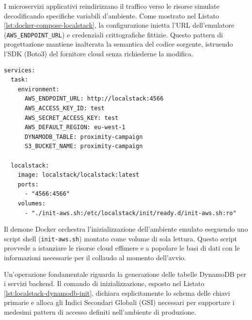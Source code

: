 I microservizi applicativi reindirizzano il traffico verso le risorse simulate decodificando specifiche variabili d'ambiente. Come mostrato nel Listato \ref{lst:docker-compose-localstack}, la configurazione inietta l'URL dell'emulatore (\texttt{AWS\_ENDPOINT\_URL}) e credenziali crittografiche fittizie. Questo pattern di progettazione mantiene inalterata la semantica del codice sorgente, istruendo l'SDK (Boto3) del fornitore cloud senza richiederne la modifica.

\begin{lstlisting}[caption={Configurazione Docker Compose per l'iniezione delle variabili d'ambiente e l'avvio di LocalStack}, label={lst:docker-compose-localstack}]
services:
  task:
    environment:
      AWS_ENDPOINT_URL: http://localstack:4566
      AWS_ACCESS_KEY_ID: test
      AWS_SECRET_ACCESS_KEY: test
      AWS_DEFAULT_REGION: eu-west-1
      DYNAMODB_TABLE: proximity-campaign
      S3_BUCKET_NAME: proximity-campaign

  localstack:
    image: localstack/localstack:latest
    ports:
      - "4566:4566"
    volumes:
      - "./init-aws.sh:/etc/localstack/init/ready.d/init-aws.sh:ro"
\end{lstlisting}

Il demone Docker orchestra l'inizializzazione dell'ambiente emulato eseguendo uno script shell (\texttt{init-aws.sh}) montato come volume di sola lettura. Questo script provvede a istanziare le risorse cloud effimere e a popolare le basi di dati con le informazioni necessarie per il collaudo al momento dell'avvio. 

Un'operazione fondamentale riguarda la generazione delle tabelle DynamoDB per i servizi backend. Il comando di inizializzazione, esposto nel Listato \ref{lst:localstack-dynamodb-init}, dichiara esplicitamente lo schema delle chiavi primarie e alloca gli Indici Secondari Globali (GSI) necessari per supportare i medesimi pattern di accesso definiti nell'ambiente di produzione.

